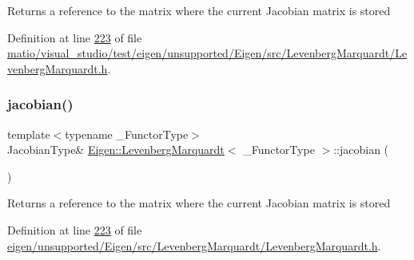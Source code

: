 \begin{DoxyReturn}{Returns}
a reference to the matrix where the current Jacobian matrix is stored 
\end{DoxyReturn}


Definition at line \hyperlink{matio_2visual__studio_2test_2eigen_2unsupported_2_eigen_2src_2_levenberg_marquardt_2_levenberg_marquardt_8h_source_l00223}{223} of file \hyperlink{matio_2visual__studio_2test_2eigen_2unsupported_2_eigen_2src_2_levenberg_marquardt_2_levenberg_marquardt_8h_source}{matio/visual\+\_\+studio/test/eigen/unsupported/\+Eigen/src/\+Levenberg\+Marquardt/\+Levenberg\+Marquardt.\+h}.

\mbox{\label{class_eigen_1_1_levenberg_marquardt_aaf2179310fdf873483f5d8b46f15da8c}} 
\subsubsection{\texorpdfstring{jacobian()}{jacobian()}\hspace{0.1cm}{\footnotesize\ttfamily [2/2]}}
{\footnotesize\ttfamily template$<$typename \+\_\+\+Functor\+Type$>$ \\
Jacobian\+Type\& \hyperlink{class_eigen_1_1_levenberg_marquardt}{Eigen\+::\+Levenberg\+Marquardt}$<$ \+\_\+\+Functor\+Type $>$\+::jacobian (\begin{DoxyParamCaption}{ }\end{DoxyParamCaption})\hspace{0.3cm}{\ttfamily [inline]}}

\begin{DoxyReturn}{Returns}
a reference to the matrix where the current Jacobian matrix is stored 
\end{DoxyReturn}


Definition at line \hyperlink{eigen_2unsupported_2_eigen_2src_2_levenberg_marquardt_2_levenberg_marquardt_8h_source_l00223}{223} of file \hyperlink{eigen_2unsupported_2_eigen_2src_2_levenberg_marquardt_2_levenberg_marquardt_8h_source}{eigen/unsupported/\+Eigen/src/\+Levenberg\+Marquardt/\+Levenberg\+Marquardt.\+h}.

\mbox{\label{class_eigen_1_1_levenberg_marquardt_aa8aa0d8c1dab58ac51df999587609e09}} 
